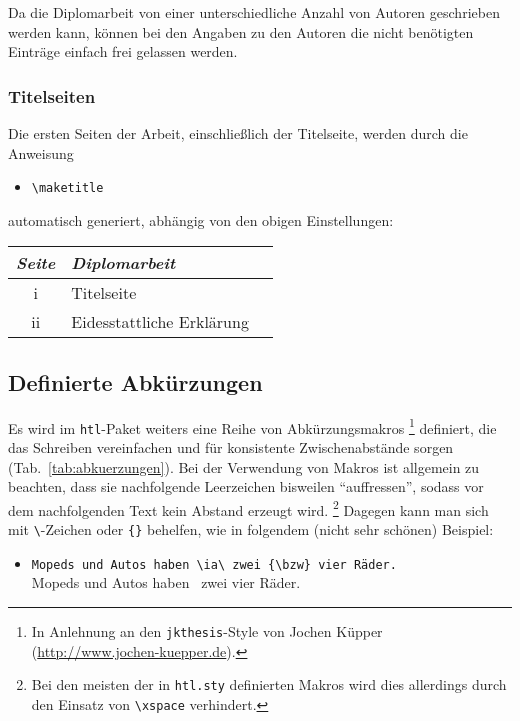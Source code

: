 Da die Diplomarbeit von einer unterschiedliche Anzahl von Autoren geschrieben werden kann, können bei den Angaben zu den Autoren die nicht benötigten Einträge einfach frei gelassen werden.


\subsubsection{Titelseiten}

Die ersten Seiten der Arbeit, einschließlich der Titelseite,
werden durch die Anweisung
\begin{itemize}
\item[] %
\verb!\maketitle!  
\end{itemize}
automatisch generiert, abhängig von den obigen
Einstellungen:
%
\begin{center}
\begin{tabular}{cll}
\emph{Seite} & \emph{Diplomarbeit} \\
  \hline
  {\rm i} & Titelseite \\
  {\rm ii} & Eidesstattliche Erklärung \\
  \hline
\end{tabular}
\end{center}






\subsection{Definierte Abkürzungen}

Es wird im \texttt{htl}-Paket weiters eine Reihe von Abkürzungsmakros%
\footnote{In Anlehnung an den \texttt{jkthesis}-Style von Jochen
Küpper (\url{http://www.jochen-kuepper.de}).} definiert, die das
Schreiben vereinfachen und für konsistente
Zwisch\-en\-ab\-stän\-de sorgen (Tab.~\ref{tab:abkuerzungen}).
Bei der Verwendung von Makros ist allgemein zu beachten, dass sie nachfolgende Leerzeichen bisweilen "`auffressen"', sodass vor dem nachfolgenden Text kein Abstand erzeugt wird.%
\footnote{Bei den meisten der in \texttt{htl.sty} definierten Makros wird dies
allerdings durch den Einsatz von \texttt{\textbackslash xspace} verhindert.} Dagegen kann man sich mit \verb!\!-Zeichen oder \verb!{}! behelfen, wie in folgendem 
(nicht sehr schönen) Beispiel:
%
\begin{itemize}
\item[] \verb!Mopeds und Autos haben \ia\ zwei {\bzw} vier Räder.!\\
      Mopeds und Autos haben \ia\ zwei {\bzw} vier Räder.
\end{itemize}


